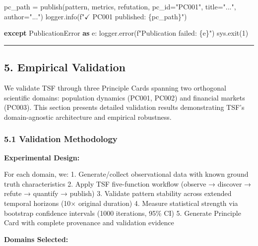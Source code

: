 \documentclass[
]{article}
\newenvironment{Shaded}{}{}
\newcommand{\ControlFlowTok}[1]{\textcolor[rgb]{0.00,0.44,0.13}{\textbf{#1}}}
\newcommand{\DecValTok}[1]{\textcolor[rgb]{0.25,0.63,0.44}{#1}}
\newcommand{\ImportTok}[1]{\textcolor[rgb]{0.00,0.50,0.00}{\textbf{#1}}}
\newcommand{\NormalTok}[1]{#1}
\newcommand{\OperatorTok}[1]{\textcolor[rgb]{0.40,0.40,0.40}{#1}}
\newcommand{\SpecialCharTok}[1]{\textcolor[rgb]{0.25,0.44,0.63}{#1}}
\newcommand{\SpecialStringTok}[1]{\textcolor[rgb]{0.73,0.40,0.53}{#1}}
\newcommand{\StringTok}[1]{\textcolor[rgb]{0.25,0.44,0.63}{#1}}
\begin{document}
\begin{Shaded}
\begin{Highlighting}[]
\NormalTok{    pc\_path }\OperatorTok{=}\NormalTok{ publish(pattern, metrics, refutation, pc\_id}\OperatorTok{=}\StringTok{"PC001"}\NormalTok{, title}\OperatorTok{=}\StringTok{"..."}\NormalTok{, author}\OperatorTok{=}\StringTok{"..."}\NormalTok{)}
\NormalTok{    logger.info(}\SpecialStringTok{f"$\checkmark$ PC001 published: }\SpecialCharTok{\{}\NormalTok{pc\_path}\SpecialCharTok{\}}\SpecialStringTok{"}\NormalTok{)}

\ControlFlowTok{except}\NormalTok{ PublicationError }\ImportTok{as}\NormalTok{ e:}
\NormalTok{    logger.error(}\SpecialStringTok{f"Publication failed: }\SpecialCharTok{\{}\NormalTok{e}\SpecialCharTok{\}}\SpecialStringTok{"}\NormalTok{)}
\NormalTok{    sys.exit(}\DecValTok{1}\NormalTok{)}
\end{Highlighting}
\end{Shaded}

\begin{center}\rule{0.5\linewidth}{0.5pt}\end{center}

\subsection{5. Empirical Validation}\label{empirical-validation}

We validate TSF through three Principle Cards spanning two orthogonal
scientific domains: population dynamics (PC001, PC002) and financial
markets (PC003). This section presents detailed validation results
demonstrating TSF's domain-agnostic architecture and empirical
robustness.

\subsubsection{5.1 Validation Methodology}\label{validation-methodology}

\textbf{Experimental Design:}

For each domain, we: 1. Generate/collect observational data with known
ground truth characteristics 2. Apply TSF five-function workflow
(observe → discover → refute → quantify → publish) 3. Validate pattern
stability across extended temporal horizons (10× original duration) 4.
Measure statistical strength via bootstrap confidence intervals (1000
iterations, 95\% CI) 5. Generate Principle Card with complete provenance
and validation evidence

\textbf{Domains Selected:}
\end{document}
